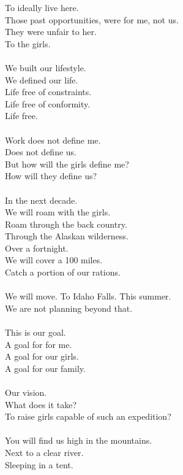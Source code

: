 \documentclass[submission]{sffms}
\begin{document}
To ideally live here.
\ \\
Those past opportunities, were for me, not us.
\ \\
They were unfair to her.
\ \\
To the girls.
\ \\
\ \\
We built our lifestyle.
\ \\
We defined our life.
\ \\
Life free of constraints.
\ \\
Life free of conformity. 
\ \\
Life free.
\ \\
\ \\
Work does not define me.
\ \\
Does not define us.
\ \\
But how will the girls define me? 
\ \\
How will they define us? 
\ \\
\ \\
In the next decade.
\ \\
We will roam with the girls.
\ \\
Roam through the back country.
\ \\
Through the Alaskan wilderness.
\ \\
Over a fortnight. 
\ \\
We will cover a 100 miles. 
\ \\
Catch a portion of our rations.
\ \\
\ \\
We will move. To Idaho Falls. This summer.
\ \\
We are not planning beyond that. 
\ \\
\ \\
This is our goal.
\ \\
A goal for for me. 
\ \\
A goal for our girls. 
\ \\
A goal for our family.
\ \\
\ \\
Our vision.
\ \\
What does it take?
\ \\
To raise girls capable of such an expedition?
\ \\
\ \\
You will find us high in the mountains.
\ \\
Next to a clear river.
\ \\
Sleeping in a tent. 
\end{document}
